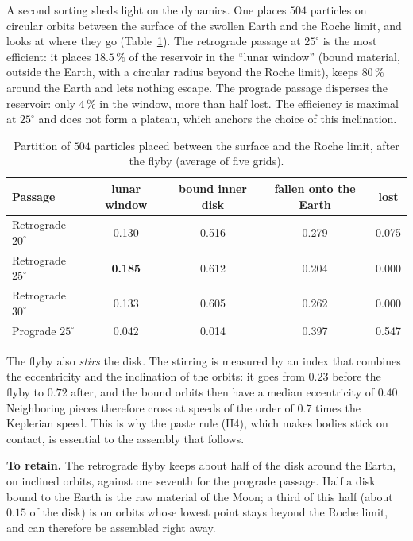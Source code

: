 \documentclass[11pt,a4paper]{article}
\begin{document}
A second sorting sheds light on the dynamics. One places $504$ particles on circular orbits between the surface of the swollen Earth and the Roche limit, and looks at where they go (Table~\ref{tab:504}). The retrograde passage at $25^\circ$ is the most efficient: it places $18.5\,\%$ of the reservoir in the ``lunar window'' (bound material, outside the Earth, with a circular radius beyond the Roche limit), keeps $80\,\%$ around the Earth and lets nothing escape. The prograde passage disperses the reservoir: only $4\,\%$ in the window, more than half lost. The efficiency is maximal at $25^\circ$ and does not form a plateau, which anchors the choice of this inclination.

\begin{table}[htbp]
\centering
\caption{Partition of $504$ particles placed between the surface and the Roche limit, after the flyby (average of five grids).\label{tab:504}}
\small
\begin{tabular}{lcccc}
\toprule
Passage & lunar window & bound inner disk & fallen onto the Earth & lost \\
\midrule
Retrograde $20^\circ$ & 0.130 & 0.516 & 0.279 & 0.075 \\
Retrograde $25^\circ$ & \textbf{0.185} & 0.612 & 0.204 & 0.000 \\
Retrograde $30^\circ$ & 0.133 & 0.605 & 0.262 & 0.000 \\
Prograde $25^\circ$ & 0.042 & 0.014 & 0.397 & 0.547 \\
\bottomrule
\end{tabular}
\end{table}

The flyby also \emph{stirs} the disk. The stirring is measured by an index that combines the eccentricity and the inclination of the orbits: it goes from $0.23$ before the flyby to $0.72$ after, and the bound orbits then have a median eccentricity of $0.40$. Neighboring pieces therefore cross at speeds of the order of $0.7$ times the Keplerian speed. This is why the paste rule (H4), which makes bodies stick on contact, is essential to the assembly that follows.

\textbf{To retain.} The retrograde flyby keeps about half of the disk around the Earth, on inclined orbits, against one seventh for the prograde passage. Half a disk bound to the Earth is the raw material of the Moon; a third of this half (about $0.15$ of the disk) is on orbits whose lowest point stays beyond the Roche limit, and can therefore be assembled right away.
\end{document}
